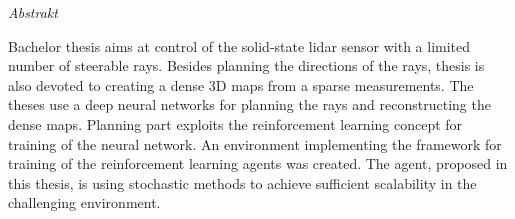 \vfill
\begin{center}
{\it \large Abstrakt}
\vspace{0.2cm}

\begin{minipage}{0.8\textwidth}{
Bachelor thesis aims at control of the solid-state lidar sensor with a limited number of steerable rays. Besides planning the directions of the rays, thesis is also devoted to creating a dense 3D maps from a sparse measurements. The theses use a deep neural networks for planning the rays and reconstructing the dense maps. Planning part exploits the reinforcement learning concept for training of the neural network. An environment implementing the framework for training of the reinforcement learning agents was created. The agent, proposed in this thesis, is using stochastic methods to achieve sufficient scalability in the challenging environment.
}
\end{minipage}
\end{center}
\vfill
\vspace{1cm}
\newpage{}
